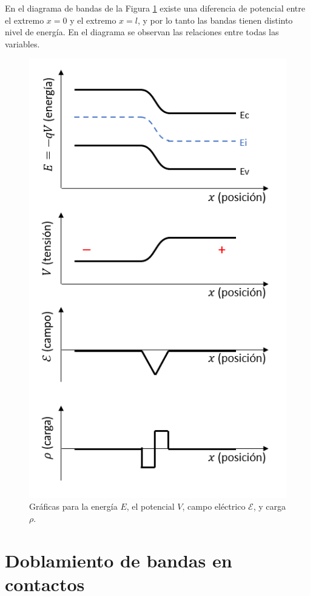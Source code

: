 En el diagrama de bandas de la Figura \ref{bandas-doblamiento-vext} existe una diferencia de potencial entre el extremo $x=0$ y el extremo $x=l$, y por lo tanto las bandas tienen distinto nivel de energía. En el diagrama se observan las relaciones entre todas las variables.

\begin{figure}[H]
    \centering
    \includegraphics{figuras/bandas-doblamiento-vext.png}
    \caption{Gráficas para la energía $E$, el potencial $V$, campo eléctrico $\mathcal{E}$, y carga $\rho$.}
    \label{bandas-doblamiento-vext}
\end{figure}

\section{Doblamiento de bandas en contactos}

